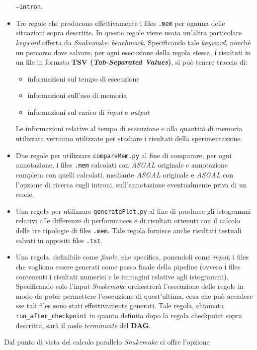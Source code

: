 \documentclass[a4paper,12pt, oneside]{book}
\begin{document}
\begin{itemize}
  \texttt{--intron}.
  \item Tre regole che producono effettivamente i files
  \texttt{.mem} per ognuna delle situazioni sopra descritte. In queste regole
  viene usata un'altra particolare \textit{keyword} offerta da
  \textit{Snakemake}: \textit{benchmark}. Specificando tale \textit{keyword},
  nonché un
  percorso dove salvare, per ogni esecuzione della regola stessa, i risultati in
  un file in formato \textbf{TSV (\textit{Tab-Separated Values})}, %
  si può tenere traccia di: 
  \begin{itemize}
    \item informazioni sul tempo di esecuzione
    \item informazioni sull'uso di memoria
    \item informazioni sul carico di \textit{input} e \textit{output}
  \end{itemize}
  Le informazioni relative al tempo di esecuzione e alla quantità di memoria
  utilizzata verranno utilizzate per studiare i risultati della sperimentazione.
  \item Due regole per utilizzare \texttt{compareMem.py} al fine di comparare,
  per ogni annotazione, i files \texttt{.mem} calcolati con \textit{ASGAL}
  originale e 
  annotazione completa con quelli calcolati, mediante \textit{ASGAL} originale e
  \textit{ASGAL} con l'opzione di ricerca sugli introni, sull'annotazione
  eventualmente priva di un esone.
  \item Una regola per utilizzare \texttt{generatePlot.py} al fine di produrre
  gli istogrammi relativi alle differenze di performances e di risultati ottenuti
  con il calcolo delle tre tipologie di files \texttt{.mem}. Tale regola fornisce
  anche risultati testuali salvati in appositi files \texttt{.txt}.
  \item Una regola, definibile come \textit{finale}, che
  specifica, ponendoli come \textit{input}, i files che vogliono essere generati
  come passo finale della pipeline (ovvero i files contenenti i risultati
  numerici e le immagini relative agli istogrammi). Specificando solo l'input
  \textit{Snakemake} orchestrerà l'esecuzione delle regole in modo da poter
  permettere l'esecuzione di quest'ultima, cosa che può accadere sse tali files
  sono stati effettivamente generati. Tale regola, chiamata
  \texttt{run\_after\_checkpoint} in quanto definita dopo la regola checkpoint
  sopra descritta, sarà il \textit{nodo terminante} del \textbf{DAG}.
\end{itemize}
Dal punto di vista del calcolo parallelo \textit{Snakemake} ci offre l'opzione
\end{document}
